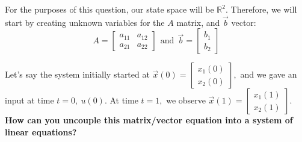 For the purposes of this question, our state space will be $\mathbb{R}^2.$ \vskip 1pt
Therefore, we will start by creating unknown variables for the $A$ matrix, and $\vec{b}$ vector:
\begin{equation}
A = \begin{bmatrix} a_{11} & a_{12} \\ a_{21} & a_{22} \end{bmatrix} \ \ \text{and} \ \ \vec{b} = \begin{bmatrix} b_{1} \\ b_{2} \end{bmatrix}
\end{equation}

\begin{enumerate}
  \qitem Let's say the system initially started at $\vec{x}(0) = \begin{bmatrix} x_{1}(0) \\ x_{2}(0) \end{bmatrix},$ and we gave an input at time $t = 0, \ u(0).$ 
  At time $t = 1,$ we observe $\vec{x}(1) = \begin{bmatrix} x_{1}(1) \\ x_{2}(1) \end{bmatrix}.$
  \textbf{How can you uncouple this matrix/vector equation into a system of linear equations?}



\end{enumerate}
